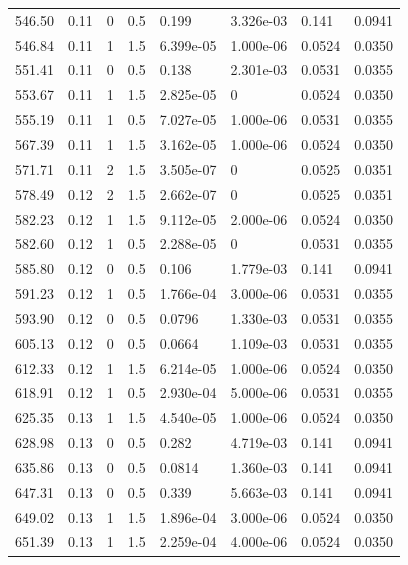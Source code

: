 \documentclass[preview]{standalone}
\begin{document}
{{{\begin{tabular}{L{1.2cm}C{1.2cm} C{0.3cm}C{0.5cm} C{1.4cm}C{1.4cm} C{1.4cm}C{1.4cm}}
  546.50  &  0.11  & 0     & 0.5 &  0.199  & 3.326e-03  & 0.141 &  0.0941   \\ 
  546.84  &  0.11  & 1     & 1.5 &  6.399e-05  & 1.000e-06  & 0.0524 &  0.0350   \\ 
  551.41  &  0.11  & 0     & 0.5 &  0.138  & 2.301e-03  & 0.0531 &  0.0355   \\ 
  553.67  &  0.11  & 1     & 1.5 &  2.825e-05  & 0  & 0.0524 &  0.0350   \\ 
  555.19  &  0.11  & 1     & 0.5 &  7.027e-05  & 1.000e-06  & 0.0531 &  0.0355   \\ 
  567.39  &  0.11  & 1     & 1.5 &  3.162e-05  & 1.000e-06  & 0.0524 &  0.0350   \\ 
  571.71  &  0.11  & 2     & 1.5 &  3.505e-07  & 0  & 0.0525 &  0.0351   \\ 
  578.49  &  0.12  & 2     & 1.5 &  2.662e-07  & 0  & 0.0525 &  0.0351   \\ 
  582.23  &  0.12  & 1     & 1.5 &  9.112e-05  & 2.000e-06  & 0.0524 &  0.0350   \\ 
  582.60  &  0.12  & 1     & 0.5 &  2.288e-05  & 0  & 0.0531 &  0.0355   \\ 
  585.80  &  0.12  & 0     & 0.5 &  0.106  & 1.779e-03  & 0.141 &  0.0941   \\ 
  591.23  &  0.12  & 1     & 0.5 &  1.766e-04  & 3.000e-06  & 0.0531 &  0.0355   \\ 
  593.90  &  0.12  & 0     & 0.5 &  0.0796  & 1.330e-03  & 0.0531 &  0.0355   \\ 
  605.13  &  0.12  & 0     & 0.5 &  0.0664  & 1.109e-03  & 0.0531 &  0.0355   \\ 
  612.33  &  0.12  & 1     & 1.5 &  6.214e-05  & 1.000e-06  & 0.0524 &  0.0350   \\ 
  618.91  &  0.12  & 1     & 0.5 &  2.930e-04  & 5.000e-06  & 0.0531 &  0.0355   \\ 
  625.35  &  0.13  & 1     & 1.5 &  4.540e-05  & 1.000e-06  & 0.0524 &  0.0350   \\ 
  628.98  &  0.13  & 0     & 0.5 &  0.282  & 4.719e-03  & 0.141 &  0.0941   \\ 
  635.86  &  0.13  & 0     & 0.5 &  0.0814  & 1.360e-03  & 0.141 &  0.0941   \\ 
  647.31  &  0.13  & 0     & 0.5 &  0.339  & 5.663e-03  & 0.141 &  0.0941   \\ 
  649.02  &  0.13  & 1     & 1.5 &  1.896e-04  & 3.000e-06  & 0.0524 &  0.0350   \\ 
  651.39  &  0.13  & 1     & 1.5 &  2.259e-04  & 4.000e-06  & 0.0524 &  0.0350   \\ 

\end{tabular}}}}
\end{document}

